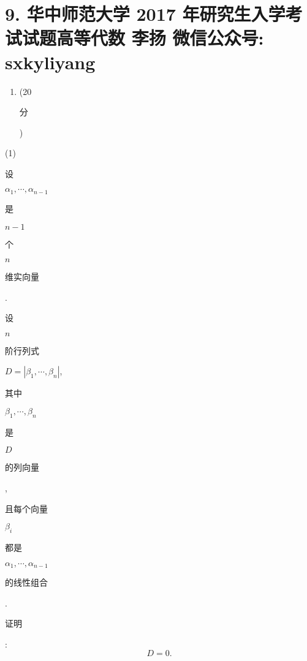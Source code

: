 \documentclass[10pt]{article}
\begin{document}
\section{9. 华中师范大学 2017 年研究生入学考试试题高等代数 
 李扬 
 微信公众号: sxkyliyang}
\begin{enumerate}
  \item (20 \begin{CJK}{UTF8}{mj}分\end{CJK})
\end{enumerate}
(1) \begin{CJK}{UTF8}{mj}设\end{CJK} $\alpha_{1}, \cdots, \alpha_{n-1}$ \begin{CJK}{UTF8}{mj}是\end{CJK} $n-1$ \begin{CJK}{UTF8}{mj}个\end{CJK} $n$ \begin{CJK}{UTF8}{mj}维实向量\end{CJK}. \begin{CJK}{UTF8}{mj}设\end{CJK} $n$ \begin{CJK}{UTF8}{mj}阶行列式\end{CJK} $D=\left|\beta_{1}, \cdots, \beta_{n}\right|$, \begin{CJK}{UTF8}{mj}其中\end{CJK} $\beta_{1}, \cdots, \beta_{n}$ \begin{CJK}{UTF8}{mj}是\end{CJK} $D$ \begin{CJK}{UTF8}{mj}的列向量\end{CJK}, \begin{CJK}{UTF8}{mj}且每个向量\end{CJK} $\beta_{i}$ \begin{CJK}{UTF8}{mj}都是\end{CJK} $\alpha_{1}, \cdots, \alpha_{n-1}$ \begin{CJK}{UTF8}{mj}的线性组合\end{CJK}. \begin{CJK}{UTF8}{mj}证明\end{CJK}:
$$
D=0 .
$$
\end{document}
